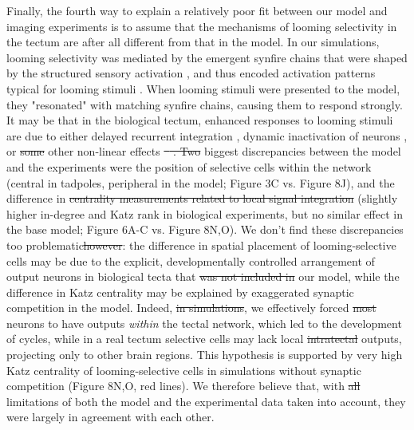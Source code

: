 \documentclass{article}
\providecommand{\DIFaddtex}[1]{{\protect\color{blue}{#1}}} %
\providecommand{\DIFdeltex}[1]{{\protect\color{red}\sout{#1}}}                      %
\providecommand{\DIFaddbegin}{} %
\providecommand{\DIFaddend}{} %
\providecommand{\DIFdelbegin}{} %
\providecommand{\DIFdelend}{} %
\providecommand{\DIFadd}[1]{\texorpdfstring{\DIFaddtex{#1}}{#1}} %
\providecommand{\DIFdel}[1]{\texorpdfstring{\DIFdeltex{#1}}{}} %
\newcommand{\DIFscaledelfig}{0.5}
\newlength{\DIFdelgraphicswidth} %
\newlength{\DIFdelgraphicsheight} %
\newcommand{\DIFaddincludegraphics}[2][]{{\color{blue}\fbox{\DIFOincludegraphics[#1]{#2}}}} %
\newcommand{\DIFdelincludegraphics}[2][]{%
\sbox{\DIFdelgraphicsbox}{\DIFOincludegraphics[#1]{#2}}%
\settoboxwidth{\DIFdelgraphicswidth}{\DIFdelgraphicsbox} %
\settoboxtotalheight{\DIFdelgraphicsheight}{\DIFdelgraphicsbox} %
\scalebox{\DIFscaledelfig}{%
\parbox[b]{\DIFdelgraphicswidth}{\usebox{\DIFdelgraphicsbox}\\[-\baselineskip] \rule{\DIFdelgraphicswidth}{0em}}\llap{\resizebox{\DIFdelgraphicswidth}{\DIFdelgraphicsheight}{%
\setlength{\unitlength}{\DIFdelgraphicswidth}%
\begin{picture}(1,1)%
\thicklines\linethickness{2pt} %
{\color[rgb]{1,0,0}\put(0,0){\framebox(1,1){}}}%
{\color[rgb]{1,0,0}\put(0,0){\line( 1,1){1}}}%
{\color[rgb]{1,0,0}\put(0,1){\line(1,-1){1}}}%
\end{picture}%
}\hspace*{3pt}}} %
} %
\DeclareRobustCommand{\DIFaddbegin}{\DIFOaddbegin \let\includegraphics\DIFaddincludegraphics} %
\DeclareRobustCommand{\DIFaddend}{\DIFOaddend \let\includegraphics\DIFOincludegraphics} %
\DeclareRobustCommand{\DIFdelbegin}{\DIFOdelbegin \let\includegraphics\DIFdelincludegraphics} %
\DeclareRobustCommand{\DIFdelend}{\DIFOaddend \let\includegraphics\DIFOincludegraphics} %
\begin{document}
\DIFdelend Finally, the fourth way to explain a relatively poor fit between our model and imaging experiments is to assume that the mechanisms of looming selectivity in the tectum are after all different from that in the model. In our simulations, looming selectivity was mediated by the emergent synfire chains \citep{cohen2002synreview, zheng2014synfire} that were shaped by the structured sensory activation \citep{vislay2006rf, clopath2010stdpcoding}, and thus encoded activation patterns typical for looming stimuli \citep{pratt2008recurrent, richards2010stdp}. When looming stimuli were presented to the model, they "resonated" with matching synfire chains, causing them to respond strongly. It may be that in the biological tectum, enhanced responses to looming stimuli are due to either delayed recurrent integration \citep{khakhalin2014, jang2016}, dynamic inactivation of neurons \citep{fotowat2011multiplexing}, or \DIFdelbegin \DIFdel{some }\DIFdelend other non-linear effects \DIFdelbegin \DIFdel{\mbox{%
\citep{baginskas2009recurrent}}\hspace{0pt}%
. Two }\DIFdelend \DIFaddbegin \DIFadd{\mbox{%
\citep{baginskas2009recurrent, heap2018dimming}}\hspace{0pt}%
. The two }\DIFaddend biggest discrepancies between the model and the experiments were the position of selective cells within the network (central in tadpoles, peripheral in the model; Figure 3C vs. Figure 8J), and the difference in \DIFdelbegin \DIFdel{centrality measurements related to local signal integration }\DIFdelend \DIFaddbegin \DIFadd{network signal integration in selective cells }\DIFaddend (slightly higher in-degree and Katz rank in biological experiments, but no similar effect in the base model; Figure 6A-C vs. Figure 8N,O). We \DIFaddbegin \DIFadd{however }\DIFaddend don't find these discrepancies too problematic\DIFdelbegin \DIFdel{however}\DIFdelend : the difference in spatial placement of looming-selective cells may be due to the explicit, developmentally controlled arrangement of output neurons in biological tecta that \DIFdelbegin \DIFdel{was not included in }\DIFdelend \DIFaddbegin \DIFadd{simply was not a part of }\DIFaddend our model, while the difference in Katz centrality may be explained by exaggerated synaptic competition in the model. Indeed, \DIFdelbegin \DIFdel{in simulations}\DIFdelend \DIFaddbegin \DIFadd{by introducing strong synaptic competition}\DIFaddend , we effectively forced \DIFdelbegin \DIFdel{most }\DIFdelend neurons to have outputs \textit{within} the tectal network, which led to the development of cycles, while in a real tectum selective cells may lack local \DIFdelbegin \DIFdel{intratectal }\DIFdelend outputs, projecting only to other brain regions. This hypothesis is supported by very high Katz centrality of looming-selective cells in simulations without synaptic competition (Figure 8N,O, red lines). We therefore believe that, with \DIFdelbegin \DIFdel{all }\DIFdelend limitations of both the model and the experimental data taken into account, they were largely in agreement with each other. 
\end{document}
